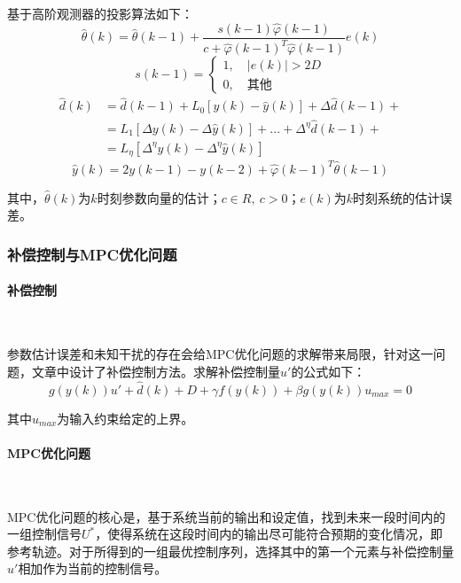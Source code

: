 \documentclass[UTF8, 12pt]{article}
\begin{document}
基于高阶观测器的投影算法如下：
\begin{equation*}
	\hat{\theta}(k) = \hat{\theta}(k-1) + \frac{s(k-1)\hat{\varphi}(k-1)}{c + \hat{\varphi}(k-1)^T\hat{\varphi}(k-1)} e(k)
\end{equation*}
\begin{equation*}
	s(k-1) = 
	\begin{cases}
		1,\quad |e(k)| > 2D \\
		0,\quad 其他
	\end{cases}
\end{equation*}
\begin{align*}
	\hat{d}(k) &= \hat{d}(k-1) + L_0[y(k) - \hat{y}(k)] + \Delta\hat{d}(k-1) + \\
	&= L_1[\Delta y(k) - \Delta\hat{y}(k)] + ... + \Delta^{\eta}\hat{d}(k-1) + \\
	&= L_{\eta}[\Delta^{\eta}y(k) - \Delta^{\eta}\hat{y}(k)]
\end{align*}
\begin{equation*}
	\hat{y}(k) = 2y(k-1) - y(k-2) + \hat{\varphi}(k-1)^T\hat{\theta}(k-1)
\end{equation*}

其中，$\hat{\theta}(k)$为$k$时刻参数向量的估计；$c \in R,\ c > 0$；$e(k)$为$k$时刻系统的估计误差。

\subsubsection{补偿控制与MPC优化问题}
\paragraph{补偿控制}~{}

参数估计误差和未知干扰的存在会给MPC优化问题的求解带来局限，针对这一问题，文章中设计了补偿控制方法。求解补偿控制量$u'$的公式如下：
\begin{equation*}
	[\hat{b}(k) + \beta]g(y(k))u' + \hat{d}(k) + D + \gamma f(y(k)) + \beta g(y(k))u_{max} = 0
\end{equation*}

其中$u_{max}$为输入约束给定的上界。

\paragraph{MPC优化问题}~{}

MPC优化问题的核心是，基于系统当前的输出和设定值，找到未来一段时间内的一组控制信号$U^*$，使得系统在这段时间内的输出尽可能符合预期的变化情况，即参考轨迹。对于所得到的一组最优控制序列，选择其中的第一个元素与补偿控制量$u'$相加作为当前的控制信号。
\end{document}
